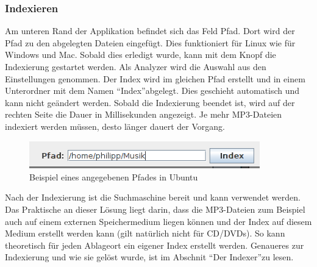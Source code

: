 \documentclass[12pt,a4paper,ngerman]{report}
\begin{document}
\subsubsection{Indexieren}
Am unteren Rand der Applikation befindet sich das Feld Pfad. Dort wird der Pfad zu den abgelegten Dateien eingefügt. Dies funktioniert für Linux wie für Windows und Mac. Sobald dies erledigt wurde, kann mit dem Knopf die Indexierung gestartet werden. Als Analyzer wird die Auswahl aus den Einstellungen genommen. Der Index wird im gleichen Pfad erstellt und in einem Unterordner mit dem Namen \textquotedblleft Index\textquotedblright abgelegt. Dies geschieht automatisch und kann nicht geändert werden. Sobald die Indexierung beendet ist, wird auf der rechten Seite die Dauer in Millisekunden angezeigt. Je mehr MP3-Dateien indexiert werden müssen, desto länger dauert der Vorgang.
\begin{figure}[h!]
\centering
\includegraphics[width=10cm]{img/Pfadangabe.png}
\caption{Beispiel eines angegebenen Pfades in Ubuntu\protect\footnotemark}
\end{figure}
Nach der Indexierung ist die Suchmaschine bereit und kann verwendet werden. Das Praktische an dieser Lösung liegt darin, dass die MP3-Dateien zum Beispiel auch auf einem externen Speichermedium liegen können und der Index auf diesem Medium erstellt werden kann (gilt natürlich nicht für CD/DVDs). So kann theoretisch für jeden Ablageort ein eigener Index erstellt werden. Genaueres zur Indexierung und wie sie gelöst wurde, ist im Abschnit \textquotedblleft Der Indexer\textquotedblright zu lesen.
\end{document}
